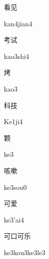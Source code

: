 \begin{verbete}{看见}
\begin{pronuncia}{kan4jian4}
\end{pronuncia}
\end{verbete}

\begin{verbete}{考试}
\begin{pronuncia}{kao3shi4}
\end{pronuncia}
\end{verbete}

\begin{verbete}[kao3]{烤}
\begin{pronuncia}{kao3}
\end{pronuncia}
\end{verbete}

\begin{verbete}[Ke1ji4]{科技}
\begin{pronuncia}{Ke1ji4}
\end{pronuncia}
\end{verbete}

\begin{verbete}[ke3]{颗}
\begin{pronuncia}{ke3}
\end{pronuncia}
\end{verbete}

\begin{verbete}[ke3sou0]{咳嗽}
\begin{pronuncia}{ke3sou0}
\end{pronuncia}
\end{verbete}

\begin{verbete}[ke3'ai4]{可爱}
\begin{pronuncia}{ke3'ai4}
\end{pronuncia}
\end{verbete}

\begin{verbete}[ke3kou3ke3le3]{可口可乐}
\begin{pronuncia}{ke3kou3ke3le3}
\end{pronuncia}
\end{verbete}

